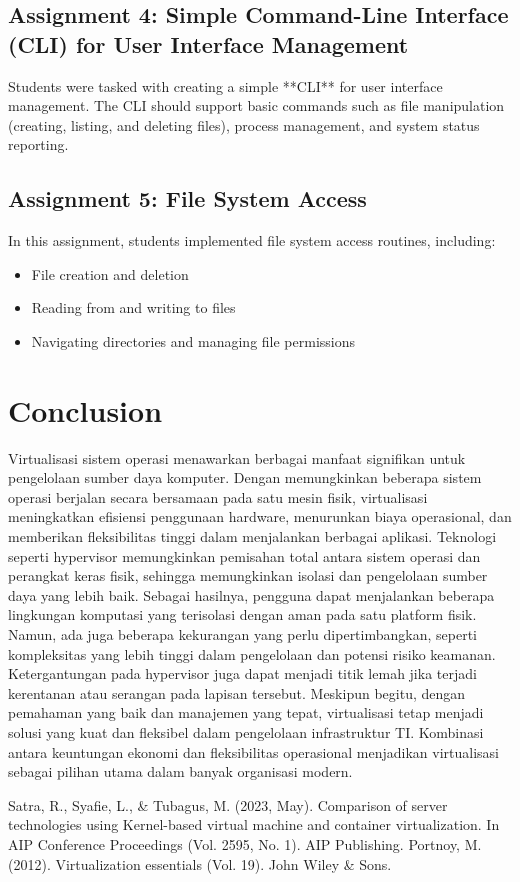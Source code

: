 \documentclass[12pt]{article}
\begin{document}
\subsection{Assignment 4: Simple Command-Line Interface (CLI) for User Interface Management}
Students were tasked with creating a simple **CLI** for user interface management. The CLI should support basic commands such as file manipulation (creating, listing, and deleting files), process management, and system status reporting.

\subsection{Assignment 5: File System Access}
In this assignment, students implemented file system access routines, including:
\begin{itemize}
    \item File creation and deletion
    \item Reading from and writing to files
    \item Navigating directories and managing file permissions
\end{itemize}

\section{Conclusion}
Virtualisasi sistem operasi menawarkan berbagai manfaat signifikan untuk pengelolaan sumber daya komputer. Dengan memungkinkan beberapa sistem operasi berjalan secara bersamaan pada satu mesin fisik, virtualisasi meningkatkan efisiensi penggunaan hardware, menurunkan biaya operasional, dan memberikan fleksibilitas tinggi dalam menjalankan berbagai aplikasi. Teknologi seperti hypervisor memungkinkan pemisahan total antara sistem operasi dan perangkat keras fisik, sehingga memungkinkan isolasi dan pengelolaan sumber daya yang lebih baik. Sebagai hasilnya, pengguna dapat menjalankan beberapa lingkungan komputasi yang terisolasi dengan aman pada satu platform fisik.
Namun, ada juga beberapa kekurangan yang perlu dipertimbangkan, seperti kompleksitas yang lebih tinggi dalam pengelolaan dan potensi risiko keamanan. Ketergantungan pada hypervisor juga dapat menjadi titik lemah jika terjadi kerentanan atau serangan pada lapisan tersebut. Meskipun begitu, dengan pemahaman yang baik dan manajemen yang tepat, virtualisasi tetap menjadi solusi yang kuat dan fleksibel dalam pengelolaan infrastruktur TI. Kombinasi antara keuntungan ekonomi dan fleksibilitas operasional menjadikan virtualisasi sebagai pilihan utama dalam banyak organisasi modern.

\begin{thebibliography}
     Satra, R., Syafie, L., & Tubagus, M. (2023, May). Comparison of server technologies using Kernel-based virtual machine and container virtualization. In AIP Conference Proceedings (Vol. 2595, No. 1). AIP Publishing.
     Portnoy, M. (2012). Virtualization essentials (Vol. 19). John Wiley & Sons.
\end{thebibliography}
\end{document}
